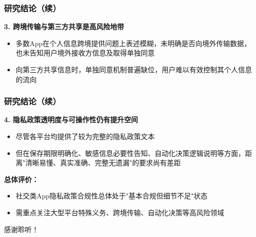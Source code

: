 \documentclass[AutoFakeBold,AutoFakeSlant]{beamer}
\begin{document}
\begin{frame}
	\frametitle{研究结论（续）}
	\textbf{3. 跨境传输与第三方共享是高风险地带}
	\begin{itemize}
		\item 多数App在个人信息跨境提供问题上表述模糊，未明确是否向境外传输数据，也未告知用户境外接收方信息及取得单独同意
		\item 向第三方共享信息时，单独同意机制普遍缺位，用户难以有效控制其个人信息的流向
	\end{itemize}
\end{frame}

\begin{frame}
	\frametitle{研究结论（续）}
	\textbf{4. 隐私政策透明度与可操作性仍有提升空间}
	\begin{itemize}
		\item 尽管各平台均提供了较为完整的隐私政策文本
		\item 但在保存期限明确化、敏感信息必要性告知、自动化决策逻辑说明等方面，距离"清晰易懂、真实准确、完整无遗漏"的要求尚有差距
	\end{itemize}
	
	\vspace{1em}
	\textbf{总体评价：}
	\begin{itemize}
		\item 社交类App隐私政策合规性总体处于"基本合规但细节不足"状态
		\item 需重点关注大型平台特殊义务、跨境传输、自动化决策等高风险领域
	\end{itemize}
\end{frame}

\begin{frame}
	\begin{center}
		{\Huge 感谢聆听！}
	\end{center}
\end{frame}
\end{document}
